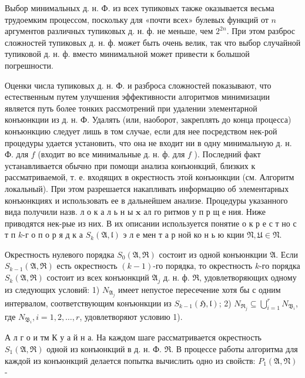 \documentclass[10pt]{article}
\begin{document}
Выбор минимальных д. н. Ф. из всех тупиковых также оказывается весьма трудоемким процессом, поскольку для «почти всех» булевых функций от $n$ аргументов различных тупиковых д. н. ф. не меньше, чем $2^{2 n}$. При этом разброс сложностей тупиковых д. н. ф. может быть очень велик, так что выбор случайной тупиковой д. н. ф. вместо минимальной может привести к болышой погрешности.



Оценки числа тупиковых д. н. Ф. и разброса сложностей показывают, что естественным путем улучшения эффективности алгоритмов минимизации является путь более тонких рассмотрений при удалении элементарной конъюнкции из д. н. Ф. Удалять (или, наоборот, закреплять до конца процесса) конъюнкцию следует лишь в том случае, если для нее посредством нек-рой процедуры удается установить, что она не входит ни в одну минимальную д. н. Ф. для $f$ (входит во все минимальные д. н. ф. для $f$ ). Последний факт устанавливается обычно при помощи анализа конъюнкций, близких к рассматриваемой, т. е. входящих в окрестность этой конъюнкции (см. Алгоритм локальный). При этом разрешается накапливать информацию об элементарных конъюнкциях и использовать ее в дальнейшем анализе. Процедуры указанного вида получили назв. л о к а л ь н ы $\mathbf{x}$ ал го ритмов у п р щ е ния. Ниже приводятся нек-рые из них. В их описании используется понятие о к р е с т но с т п $k$-г о п о р я д к а $S_{k}(\mathfrak{A}, \mathfrak{l})$ э л е мен т а р ной ко н ь ю кции $\mathfrak{N}, \mathfrak{\mathfrak { U }} \in \mathfrak{N}$.



Окрестность нулевого порядка $S_{0}(\mathfrak{A}, \mathfrak{R})$ состоит из одной конъюнкции $\mathfrak{A}$. Если $S_{k-1}(\mathfrak{A}, \mathfrak{R})$ есть окрестность $(k-1)$-го порядка, то окрестность $k$-го порядка $S_{k}(\mathfrak{A}, \mathfrak{\Re})$ состоит из всех конъюнкций $\mathfrak{A}_{j}$ д. н. ф. $\mathfrak{R}$, удовлетворяющих одному из следующих условий: 1) $N_{\mathfrak{A}_{j}}$ имеет непустое пересечение хотя бы с одним интервалом, соответствующим конъюнкции из $S_{k-1}(\mathfrak{H}, \mathfrak{l})$; 2) $N_{\mathfrak{\Re}_{j}} \subseteq \bigcup_{i=1}^{r} N_{\mathfrak{B}_{i}}$, где $N_{\mathfrak{B}_{i}}, i=1,2, \ldots, r$, удовлетворяют условию 1).



А л г о и тм К у а й н а. На каждом шаге рассматривается окрестность $S_{1}(\mathfrak{A}, \mathfrak{R})$ одной из конъюнкций в д. н. Ф. $\mathfrak{R}$. В процессе работы алгоритма для каждой из конъюнкций делается попытка вычислить одно из свойств: $P_{1}(\mathfrak{A}, \mathfrak{N})$ -
\end{document}
